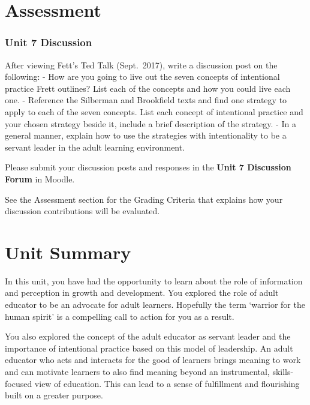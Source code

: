 \documentclass[
]{book}
\begin{document}
\hypertarget{assessment-6}{%
\section*{Assessment}\label{assessment-6}}

\begin{assessment}
\hypertarget{unit-7-discussion}{%
\subsubsection{Unit 7 Discussion}\label{unit-7-discussion}}

After viewing Fett's Ted Talk (Sept.~2017), write a discussion post on
the following: - How are you going to live out the seven concepts of
intentional practice Frett outlines? List each of the concepts and how
you could live each one. - Reference the Silberman and Brookfield texts
and find one strategy to apply to each of the seven concepts. List each
concept of intentional practice and your chosen strategy beside it,
include a brief description of the strategy. - In a general manner,
explain how to use the strategies with intentionality to be a servant
leader in the adult learning environment. ~~

Please submit your discussion posts and responses in the \textbf{Unit 7
Discussion Forum} in Moodle.

See the Assessment section for the Grading Criteria that explains how
your discussion contributions will be evaluated.
\end{assessment}

\hypertarget{unit-summary}{%
\section{Unit Summary}\label{unit-summary}}

In this unit, you have had the opportunity to learn about the role of
information and perception in growth and development. You explored the role of
adult educator to be an advocate for adult learners. Hopefully the term `warrior
for the human spirit' is a compelling call to action for you as a result.

You also explored the concept of the adult educator as servant leader and the
importance of intentional practice based on this model of leadership. An adult
educator who acts and interacts for the good of learners brings meaning to work
and can motivate learners to also find meaning beyond an instrumental,
skills-focused view of education. This can lead to a sense of fulfillment and
flourishing built on a greater purpose.
\end{document}
